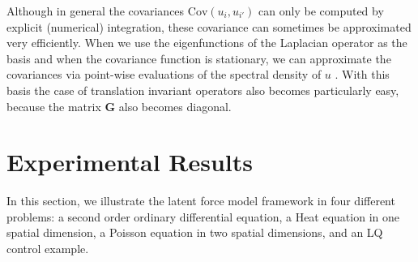 \documentclass[journal]{IEEEtran}
\newcommand{\simo}[1]{{\color{red}#1}}
\begin{document}
Although in general the covariances $\mathrm{Cov}(u_i,u_{i'})$ can only be computed by explicit (numerical) integration, these covariance can sometimes be approximated very efficiently. When we use the eigenfunctions of the Laplacian operator as the basis and when the covariance function is stationary, we can approximate the covariances via point-wise evaluations of the spectral density of $u$ \cite{Solin+Sarkka:2016}. With this basis the case of translation invariant operators also becomes particularly easy, because the matrix $\mathbf{G}$ also becomes diagonal.




%

\section{Experimental Results}

In this section, we illustrate the latent force model framework in four different problems: a second order
ordinary differential equation, a Heat equation in one spatial
dimension, a Poisson equation in two spatial dimensions, and an LQ
control example. 
\end{document}
